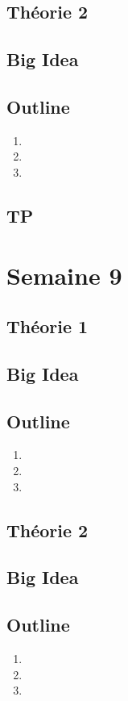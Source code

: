 \documentclass{article}
\begin{document}
\subsection{Théorie 2}
\subsection*{Big Idea}
\subsection*{Outline}
\begin{enumerate}
    \item
    \item
    \item
\end{enumerate}
\subsection{TP}

\pagebreak
\section{Semaine 9}
\subsection{Théorie 1}
\subsection*{Big Idea}
\subsection*{Outline}
\begin{enumerate}
    \item
    \item
    \item
\end{enumerate}
\subsection{Théorie 2}
\subsection*{Big Idea}
\subsection*{Outline}
\begin{enumerate}
    \item
    \item
    \item
\end{enumerate}
\end{document}
